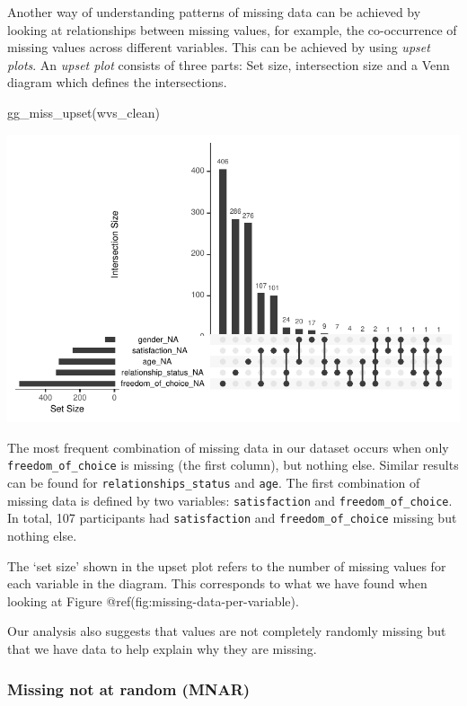 \documentclass[
  letterpaper,
]{krantz}
\makeatletter
\newenvironment{Shaded}{\begin{snugshade}}{\end{snugshade}}
\newcommand{\FunctionTok}[1]{\textcolor[rgb]{0.28,0.35,0.67}{#1}}
\newcommand{\NormalTok}[1]{\textcolor[rgb]{0.00,0.23,0.31}{#1}}
\newenvironment{kframe}{%
\medskip{}
\setlength{\fboxsep}{.8em}
 \def\at@end@of@kframe{}%
 \ifinner\ifhmode%
  \def\at@end@of@kframe{\end{minipage}}%
  \begin{minipage}{\columnwidth}%
 \fi\fi%
 \def\FrameCommand##1{\hskip\@totalleftmargin \hskip-\fboxsep
 \colorbox{shadecolor}{##1}\hskip-\fboxsep
     \hskip-\linewidth \hskip-\@totalleftmargin \hskip\columnwidth}%
 \MakeFramed {\advance\hsize-\width
   \@totalleftmargin\z@ \linewidth\hsize
   \@setminipage}}%
 {\par\unskip\endMakeFramed%
 \at@end@of@kframe}
\renewenvironment{Shaded}{\begin{kframe}}{\end{kframe}}
\makeatother
\begin{document}
Another way of understanding patterns of missing data can be achieved by
looking at relationships between missing values, for example, the
co-occurrence of missing values across different variables. This can be
achieved by using \emph{upset plots}. An \emph{upset plot} consists of
three parts: Set size, intersection size and a Venn diagram which
defines the intersections.

\begin{Shaded}
\begin{Highlighting}[]
\FunctionTok{gg\_miss\_upset}\NormalTok{(wvs\_clean)}
\end{Highlighting}
\end{Shaded}

\includegraphics{07_data_wrangling_files/figure-pdf/upset-plot-1.pdf}

The most frequent combination of missing data in our dataset occurs when
only \texttt{freedom\_of\_choice} is missing (the first column), but
nothing else. Similar results can be found for
\texttt{relationships\_status} and \texttt{age}. The first combination
of missing data is defined by two variables: \texttt{satisfaction} and
\texttt{freedom\_of\_choice}. In total, 107 participants had
\texttt{satisfaction} and \texttt{freedom\_of\_choice} missing but
nothing else.

The `set size' shown in the upset plot refers to the number of missing
values for each variable in the diagram. This corresponds to what we
have found when looking at Figure @ref(fig:missing-data-per-variable).

Our analysis also suggests that values are not completely randomly
missing but that we have data to help explain why they are missing.

\subsubsection{Missing not at random
(MNAR)}\label{sec-missing-not-at-random-mnar}
\end{document}
